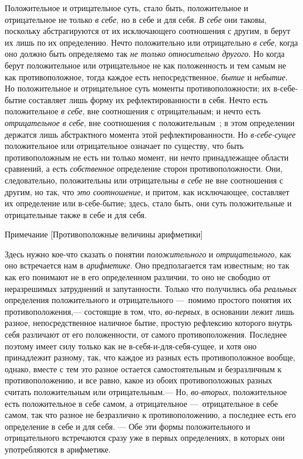 Положительное и отрицательное суть, стало быть, положительное и
отрицательное не только {\em в себе}, но в себе и для
себя. {\em В себе} они таковы, поскольку абстрагируются
от их исключающего соотношения с другим, в берут их лишь по их определению.
Нечто положительно или отрицательно {\em в себе}, когда
оно должно быть определяемо так {\em не только
относительно другого}. Но когда берут положительное или отрицательное не
как положенность и тем самым не как противоположное, тогда каждое есть
непосредственное, {\em бытие} и
{\em небытие}. Но положительное и отрицательное суть
моменты противоположности; их в-себе-бытие составляет лишь форму их
рефлектированности в себя. Нечто есть положительное
{\em в себе}, вне соотношения с отрицательным; и нечто
есть {\em отрицательное в себе}, вне соотношения с
положительным~\label{bkm:Ref474666865};
в этом определении держатся лишь абстрактного момента этой
рефлектированности. Но {\em в-себе-сущее} положительное
или отрицательное означает по существу, что быть противоположным не есть ни
только момент, ни нечто принадлежащее области сравнений, а есть
{\em собственное} определение сторон противоположности.
Они, следовательно, положительны или отрицательны
{\em в себе} не вне соотношения с другим, но так, что
{\em это соотношение}, и притом, как исключающее,
составляет их определение или в-себе-бытие; здесь, стало быть, они суть
положительные и отрицательные также в себе и для себя.

{\centering
Примечание
[Противоположные величины арифметики]
\par}

Здесь нужно кое-что сказать о понятии
{\em положительного} и
{\em отрицательного}, как оно встречается нам в
{\em арифметике}. Оно предполагается там известным; но
так как его понимают не в его определенном различии, то оно не свободно от
неразрешимых затруднений и запутанности. Только что получились оба
{\em реальных} определения положительного и
отрицательного —~помимо простого понятия их противоположения,— состоящие в
том, что, {\em во-первых}, в основании лежит лишь
разное, непосредственное наличное бытие, простую рефлексию которого внутрь
себя различают от его положенности, от самого противоположения. Последнее
поэтому имеет силу только как не в-себя-и-для-себя-сущее, и хотя оно
принадлежит разному, так, что каждое из разных есть противоположное вообще,
однако, вместе с тем это разное остается самостоятельным и безразличным к
противоположению, и все равно, какое из обоих противоположных разных
считать положительным или отрицательным.— Но,
{\em во-вторых}, положительное есть положительное в
себе самом, а отрицательное —~отрицательное в себе самом, так что разное не
безразлично к противоположению, а последнее есть его определение в себе и
для себя. — Обе эти формы положительного и отрицательного встречаются сразу
уже в первых определениях, в которых они употребляются в арифметике.


